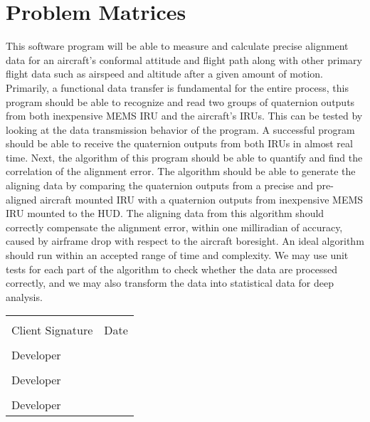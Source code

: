 \documentclass[letterpaper,10pt,titlepage]{article}
\begin{document}
\section*{Problem Matrices}
This software program will be able to measure and calculate precise alignment data for an aircraft’s conformal attitude and flight path along with other primary flight data such as airspeed and altitude after a given amount of motion. Primarily, a functional data transfer is fundamental for the entire process, this program should be able to recognize and read two groups of quaternion outputs from both inexpensive MEMS IRU and the aircraft’s IRUs. This can be tested by looking at the data transmission behavior of the program. A successful program should be able to receive the quaternion outputs from both IRUs in almost real time. Next, the algorithm of this program should be able to quantify and find the correlation of the alignment error. The algorithm should be able to generate the aligning data by comparing the quaternion outputs from a precise and pre-aligned aircraft mounted IRU with a quaternion outputs from inexpensive MEMS IRU mounted to the HUD.  The aligning data from this algorithm should correctly compensate the alignment error, within one milliradian of accuracy, caused by airframe drop with respect to the aircraft boresight. An ideal algorithm should run within an accepted range of time and complexity. We may use unit tests for each part of the algorithm to check whether the data are processed correctly, and we may also transform the data into statistical data for deep analysis.


%
%


\newpage
	\noindent\begin{tabular}{ll}
	\\[2cm]
	\makebox[2.5in]{\hrulefill} & \makebox[2.5in]{\hrulefill}\\
	Client Signature& Date\\[8ex]%
	\makebox[2.5in]{\hrulefill}\\
	Developer\\[8ex]
	\makebox[2.5in]{\hrulefill}\\
	Developer\\[8ex]
	\makebox[2.5in]{\hrulefill}\\
	Developer\\[8ex]
	\end{tabular}
\end{document}
